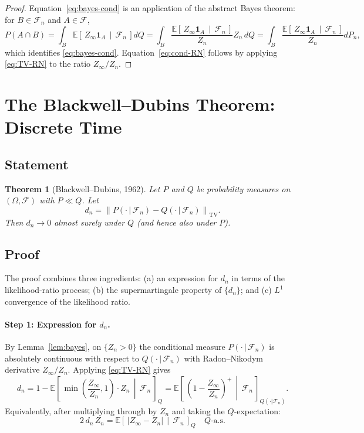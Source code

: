 \documentclass[12pt]{article}
\newtheorem{theorem}{Theorem}[section]
\newcommand{\Ec}[2]{\mathbb{E}\!\left[\,#1\,\middle|\,#2\,\right]}
\newcommand{\TV}[1]{\left\|#1\right\|_{\mathrm{TV}}}
\begin{document}
\begin{proof}
Equation~\eqref{eq:bayes-cond} is an application of the abstract Bayes
theorem: for $B \in \mathscr{F}_n$ and $A \in \mathscr{F}$,
\[
P(A \cap B) = \int_B \Ec{Z_\infty \mathbf{1}_A}{\mathscr{F}_n} dQ
= \int_B \frac{\Ec{Z_\infty \mathbf{1}_A}{\mathscr{F}_n}}{Z_n} Z_n \, dQ
= \int_B \frac{\Ec{Z_\infty \mathbf{1}_A}{\mathscr{F}_n}}{Z_n} dP_n,
\]
which identifies \eqref{eq:bayes-cond}.  Equation~\eqref{eq:cond-RN} follows
by applying \eqref{eq:TV-RN} to the ratio $Z_\infty/Z_n$.
\end{proof}

\section{The Blackwell--Dubins Theorem: Discrete Time}
\label{sec:BD}

\subsection{Statement}

\begin{theorem}[Blackwell--Dubins, 1962]
\label{thm:BD}
Let $P$ and $Q$ be probability measures on $(\Omega, \mathscr{F})$ with
$P \ll Q$.  Let
\[
d_n = \TV{P(\cdot\,|\,\mathscr{F}_n) - Q(\cdot\,|\,\mathscr{F}_n)}.
\]
Then $d_n \to 0$ almost surely under $Q$ (and hence also under $P$).
\end{theorem}

\subsection{Proof}

The proof combines three ingredients: (a) an expression for $d_n$ in terms
of the likelihood-ratio process; (b) the supermartingale property of
$\{d_n\}$; and (c) $L^1$ convergence of the likelihood ratio.

\paragraph{Step 1: Expression for $d_n$.}

By Lemma~\ref{lem:bayes}, on $\{Z_n > 0\}$ the conditional measure
$P(\cdot\,|\,\mathscr{F}_n)$ is absolutely continuous with respect to
$Q(\cdot\,|\,\mathscr{F}_n)$ with Radon--Nikodym derivative $Z_\infty/Z_n$.
Applying \eqref{eq:TV-RN} gives
\begin{equation}
\label{eq:dn-formula}
d_n
= 1 - \Ec{\min\!\left(\frac{Z_\infty}{Z_n}, 1\right) \cdot Z_n}{\mathscr{F}_n}_{Q}
= \Ec{\left(1 - \frac{Z_\infty}{Z_n}\right)^+}{\mathscr{F}_n}_{Q(\cdot|\mathscr{F}_n)}.
\end{equation}
Equivalently, after multiplying through by $Z_n$ and taking the $Q$-expectation:
\begin{equation}
\label{eq:dn-L1}
2\, d_n\, Z_n
= \Ec{|Z_\infty - Z_n|}{\mathscr{F}_n}_{Q}
\quad Q\text{-a.s.}
\end{equation}
\end{document}

